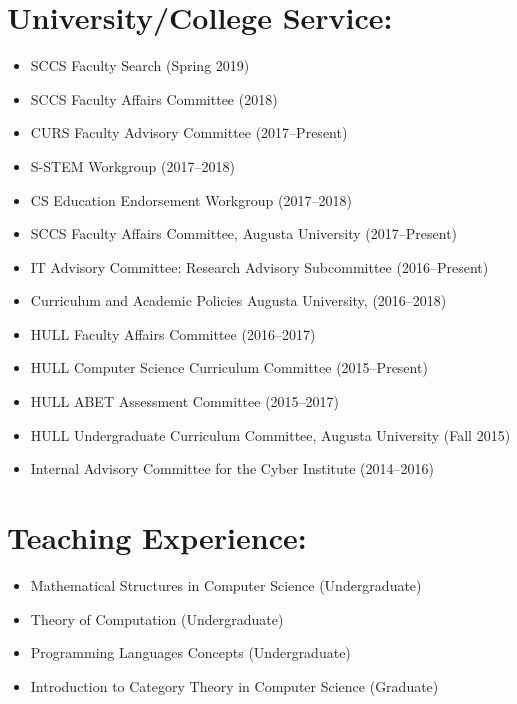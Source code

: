 \documentclass[11pt]{article}
\begin{document}

\section{University/College Service:}
\label{sec:universitycollege_service:}
\begin{itemize}
\item SCCS Faculty Search (Spring 2019)
\item SCCS Faculty Affairs Committee (2018)
\item CURS Faculty Advisory Committee (2017--Present)
\item S-STEM Workgroup (2017--2018)
\item CS Education Endorsement Workgroup (2017--2018)
\item SCCS Faculty Affairs Committee, Augusta University (2017--Present)
\item IT Advisory Committee: Research Advisory Subcommittee (2016--Present)
\item Curriculum and Academic Policies Augusta University, (2016--2018)
\item HULL Faculty Affairs Committee (2016--2017)
\item HULL Computer Science Curriculum Committee (2015--Present)
\item HULL ABET Assessment Committee (2015--2017) 
\item HULL Undergraduate Curriculum Committee, Augusta University (Fall 2015)
\item Internal Advisory Committee for the Cyber Institute (2014--2016)
\end{itemize}


\section{Teaching Experience:}
\label{sec:teaching_experience:}
\begin{itemize}
\item Mathematical Structures in Computer Science (Undergraduate)
\item Theory of Computation (Undergraduate)
\item Programming Languages Concepts (Undergraduate)  
\item Introduction to Category Theory in Computer Science (Graduate)
\end{itemize}
\end{document}

